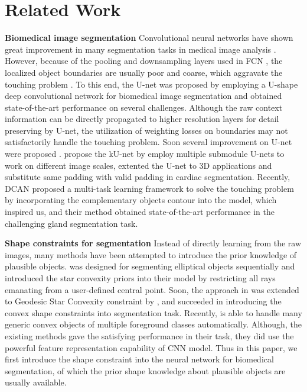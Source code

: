 \section{Related Work}
\textbf{Biomedical image segmentation} Convolutional neural networks have shown great improvement in many segmentation tasks in medical image analysis \cite{Dhungel2015a,Roth2015a,Roth2016,Chen2016e,Nogues2016,Dou2016,Qin2016,Chen2017,Ronneberger2015,Lieman-Sifry2017,Chen2016c}.
However, because of the pooling and downsampling layers used in FCN \cite{Long2015}, the localized object boundaries are usually poor and coarse, which aggravate the touching problem \cite{Dou2016,Chen2017,Ronneberger2015,Lieman-Sifry2017,Chen2016c}.
To this end, the U-net was proposed by employing a U-shape deep convolutional network for biomedical image segmentation and obtained state-of-the-art performance on several challenges.
Although the raw context information can be directly propagated to higher resolution layers for detail preserving by U-net, the utilization of weighting losses on boundaries may not satisfactorily handle the touching problem.
Soon several improvement on U-net were proposed \cite{Lieman-Sifry2017,Chen2016c,Cicek2016}.
\cite{Chen2016c} propose the kU-net by employ multiple submodule U-nets to work on different image scales, \cite{Cicek2016} extented the U-net to 3D applications and \cite{Lieman-Sifry2017} substitute same padding with valid padding in cardiac segmentation.
Recently, DCAN \cite{Chen2017} proposed a multi-task learning framework to solve the touching problem by incorporating the complementary objects contour into the model, which inspired us, and their method obtained state-of-the-art performance in the challenging gland segmentation task.

\textbf{Shape constraints for segmentation} Instead of directly learning from the raw images, many methods have been attempted to introduce the prior knowledge of plausible objects.
\cite{Delgado-Gonzalo2012} was designed for segmenting elliptical objects sequentially and \cite{Veksler2008a} introduced the star convexity priors into their model by restricting all rays emanating from a user-defined central point.
Soon, the approach in \cite{Veksler2008a} was extended to Geodesic Star Convexity constraint by \cite{Gulshan2010a}, and \cite{Gorelick2014a} succeeded in introducing the convex shape constraints into segmentation task.
Recently, \cite{Royer2016a} is able to handle many generic convex objects of multiple foreground classes automatically.
Although, the existing methods gave the satisfying performance in their task, they did use the powerful feature representation capability of CNN model.
Thus in this paper, we first introduce the shape constraint into the neural network for biomedical segmentation, of which the prior shape knowledge about plausible objects are usually available.
